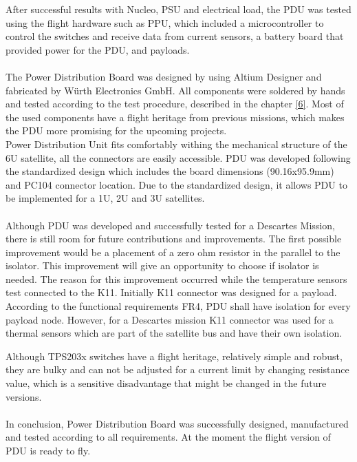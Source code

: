After successful results with Nucleo, PSU and electrical load, the PDU was tested using the flight hardware such as PPU, which included a microcontroller to control the switches and receive data from current sensors, a battery board that provided power for the PDU, and payloads. 
\\ \\
The Power Distribution Board was designed by using Altium Designer and fabricated by Würth Electronics GmbH. All components were soldered by hands and tested according to the test procedure, described in the chapter \ref{6}. Most of the used components have a flight heritage from previous missions, which makes the PDU more promising for the upcoming projects.  \\ 
Power Distribution Unit fits comfortably withing the mechanical structure of the 6U satellite, all the connectors are easily accessible.
PDU was developed following the standardized design which includes the board dimensions (90.16x95.9mm) and PC104 connector location.
Due to the standardized design, it allows PDU to be implemented for a 1U, 2U and 3U satellites. \\ \\
Although PDU was developed and successfully tested for a Descartes Mission, there is still room for future contributions and improvements. The first possible improvement would be a placement of a zero ohm resistor in the parallel to the isolator. This improvement will give an opportunity to choose if isolator is needed. The reason for this improvement occurred while the temperature sensors test connected to the K11. Initially K11 connector was designed for a payload. According to the functional requirements FR4, PDU shall have isolation for every payload node. However, for a Descartes mission K11 connector was used for a thermal sensors which are part of the satellite bus and have their own isolation.

 Although TPS203x switches have a flight heritage, relatively simple and robust, they are bulky and can not be adjusted for a current limit by changing resistance value, which is a sensitive disadvantage that might be changed in the future versions.  \\ \\
In conclusion, Power Distribution Board was successfully designed,  manufactured and tested according to all requirements. At the moment the flight version of PDU is ready to fly. 
